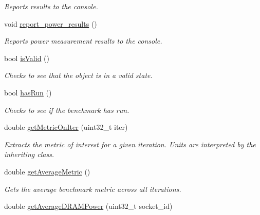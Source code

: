 \begin{DoxyCompactItemize}
\begin{DoxyCompactList}\small\item\em Reports results to the console. \end{DoxyCompactList}\item 
\hypertarget{classxmem_1_1benchmark_1_1_benchmark_a3cd60d59ac20e06f89cd3b4777bda5c7}{}void \hyperlink{classxmem_1_1benchmark_1_1_benchmark_a3cd60d59ac20e06f89cd3b4777bda5c7}{report\+\_\+power\+\_\+results} ()\label{classxmem_1_1benchmark_1_1_benchmark_a3cd60d59ac20e06f89cd3b4777bda5c7}

\begin{DoxyCompactList}\small\item\em Reports power measurement results to the console. \end{DoxyCompactList}\item 
bool \hyperlink{classxmem_1_1benchmark_1_1_benchmark_a5b08d817dd61666037957a3e23861512}{is\+Valid} ()
\begin{DoxyCompactList}\small\item\em Checks to see that the object is in a valid state. \end{DoxyCompactList}\item 
bool \hyperlink{classxmem_1_1benchmark_1_1_benchmark_a41afaa57de8ef2c66d31a41fa5f100c8}{has\+Run} ()
\begin{DoxyCompactList}\small\item\em Checks to see if the benchmark has run. \end{DoxyCompactList}\item 
double \hyperlink{classxmem_1_1benchmark_1_1_benchmark_a8bd36816a1414eaf488a6b63ba407200}{get\+Metric\+On\+Iter} (uint32\+\_\+t iter)
\begin{DoxyCompactList}\small\item\em Extracts the metric of interest for a given iteration. Units are interpreted by the inheriting class. \end{DoxyCompactList}\item 
double \hyperlink{classxmem_1_1benchmark_1_1_benchmark_a0beee3c5527e78ddb180ff20fe299e64}{get\+Average\+Metric} ()
\begin{DoxyCompactList}\small\item\em Gets the average benchmark metric across all iterations. \end{DoxyCompactList}\item 
double \hyperlink{classxmem_1_1benchmark_1_1_benchmark_aade8f8ba1268de6e112c222932b4224d}{get\+Average\+D\+R\+A\+M\+Power} (uint32\+\_\+t socket\+\_\+id)

\end{DoxyCompactItemize}
